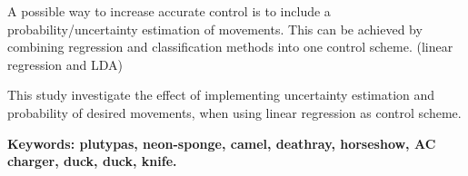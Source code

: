 


A possible way to increase accurate control is to include a probability/uncertainty estimation of movements. This can be achieved by combining regression and classification methods into one control scheme. (linear regression and LDA)

This study investigate the effect of implementing uncertainty estimation and probability of desired movements, when using linear regression as control scheme. 


\textbf{Keywords: plutypas, neon-sponge, camel, deathray, horseshow, AC charger, duck, duck, knife.}